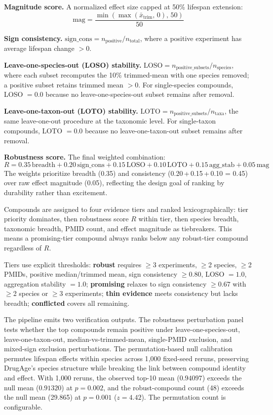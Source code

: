 \documentclass[11pt]{article}
\begin{document}
\textbf{Magnitude score.} A normalized effect size capped at 50\% lifespan extension:
\[
  \text{mag} = \frac{\min(\max(\bar{x}_{\text{trim}},\,0),\,50)}{50}
\]

\textbf{Sign consistency.} $\text{sign\_cons} = n_{\text{positive}} / n_{\text{total}}$, where a positive experiment has average lifespan change $> 0$.

\textbf{Leave-one-species-out (LOSO) stability.} $\text{LOSO} = n_{\text{positive\_subsets}} / n_{\text{species}}$, where each subset recomputes the 10\% trimmed-mean with one species removed; a positive subset retains trimmed mean $> 0$. For single-species compounds, LOSO $= 0.0$ because no leave-one-species-out subset remains after removal.

\textbf{Leave-one-taxon-out (LOTO) stability.} $\text{LOTO} = n_{\text{positive\_subsets}} / n_{\text{taxa}}$, the same leave-one-out procedure at the taxonomic level. For single-taxon compounds, LOTO $= 0.0$ because no leave-one-taxon-out subset remains after removal.

\textbf{Robustness score.} The final weighted combination:
\[
  R = 0.35\,\text{breadth} + 0.20\,\text{sign\_cons} + 0.15\,\text{LOSO} + 0.10\,\text{LOTO} + 0.15\,\text{agg\_stab} + 0.05\,\text{mag}
\]
The weights prioritize breadth (0.35) and consistency (0.20\,+\,0.15\,+\,0.10 = 0.45) over raw effect magnitude (0.05), reflecting the design goal of ranking by durability rather than excitement.

Compounds are assigned to four evidence tiers and ranked lexicographically: tier priority dominates, then robustness score $R$ within tier, then species breadth, taxonomic breadth, PMID count, and effect magnitude as tiebreakers. This means a promising-tier compound always ranks below any robust-tier compound regardless of $R$.

Tiers use explicit thresholds: \textbf{robust} requires $\geq$3 experiments, $\geq$2 species, $\geq$2 PMIDs, positive median/trimmed mean, sign consistency $\geq 0.80$, LOSO $= 1.0$, aggregation stability $= 1.0$; \textbf{promising} relaxes to sign consistency $\geq 0.67$ with $\geq$2 species or $\geq$3 experiments; \textbf{thin evidence} meets consistency but lacks breadth; \textbf{conflicted} covers all remaining.

The pipeline emits two verification outputs. The robustness perturbation panel tests whether the top compounds remain positive under leave-one-species-out, leave-one-taxon-out, median-vs-trimmed-mean, single-PMID exclusion, and mixed-sign exclusion perturbations. The permutation-based null calibration permutes lifespan effects within species across 1{,}000 fixed-seed reruns, preserving DrugAge's species structure while breaking the link between compound identity and effect. With 1{,}000 reruns, the observed top-10 mean ($0.94097$) exceeds the null mean ($0.91320$) at $p = 0.002$, and the robust-compound count (48) exceeds the null mean (29.865) at $p = 0.001$ ($z = 4.42$). The permutation count is configurable.
\end{document}
